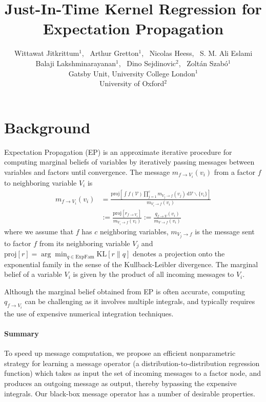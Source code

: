 \documentclass[a4paper,10pt]{article}
\title{Just-In-Time Kernel Regression for \\Expectation Propagation}
\author{
    Wittawat Jitkrittum$^1$, \, Arthur Gretton$^1$, \, Nicolas Heess, \, S. M. Ali Eslami \\
    \vspace{5mm}
    Balaji Lakshminarayanan$^1$, \, Dino Sejdinovic$^2$, \, Zolt{\'a}n Szab{\'o}$^1$ \\ 
%
Gatsby Unit, University College London$^1$ \\
University of Oxford$^2$ 
}
\begin{document}
\maketitle

\section{Background}

Expectation Propagation (EP) is an approximate iterative procedure for
computing marginal beliefs of variables by iteratively passing messages between
variables and factors until convergence.  The message $m_{f \rightarrow V_i}(v_i)$ 
from a factor $f$ to neighboring variable $V_i$ is 
\begin{align*}
    m_{f \rightarrow V_i}(v_i) &= \frac{
        \mathrm{proj}\left[ 
            \int f(\mathcal{V}) \prod_{j=1}^c m_{V_j \rightarrow f}(v_j) 
            \, \mathrm{d}\mathcal{V} \backslash \{v_i \}
        \right]
    }{m_{V_i \rightarrow f}(v_i) }  \\
    &:=
    \frac{ \mathrm{proj}[r_{f \rightarrow V_i}]}{m_{V_i \rightarrow f}(v_i)} 
    :=
    \frac{q_{f \rightarrow V}(v_i)}{m_{V \rightarrow f}(v_i)} 
\end{align*}
where we assume that $f$ has $c$ neighboring variables, $m_{V_j \rightarrow f}$
is the message sent to factor $f$ from its neighboring 
variable $V_j$ and $\mathrm{proj}[r] = \arg\min_{q \in \mathrm{ExpFam}} \mathrm{KL}[r \| q]$ denotes a projection onto the
exponential family in the sense of the Kullback-Leibler divergence.
The marginal belief of a variable $V_i$ is given by the product of all incoming messages 
to $V_i$. 


Although the marginal belief obtained from EP is often accurate, computing
$q_{f \rightarrow V_i}$ can be challenging as it involves multiple integrals, and 
typically requires the use of expensive numerical integration techniques.


\paragraph{Summary}

To speed up message computation, we propose an
efficient nonparametric strategy for learning a message operator (a
distribution-to-distribution regression function)
which takes as input the set of incoming messages to a factor node, and produces an 
outgoing message as output, thereby bypassing the expensive integrals. 
Our black-box message operator has a number of desirable properties.
\end{document}
